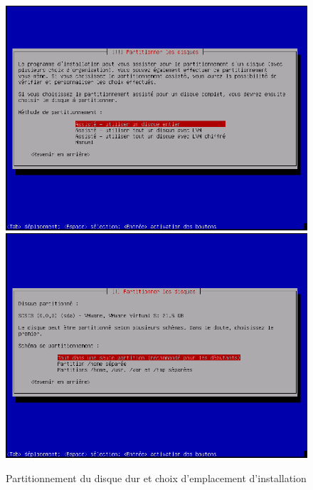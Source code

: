 \begin{figure}
 \includegraphics[scale=0.35]{img/install/Deb_inst_9.png}
 \includegraphics[scale=0.35]{img/install/Deb_inst_11.png}
 \caption{Partitionnement du disque dur et choix d'emplacement d'installation}
\end{figure}
